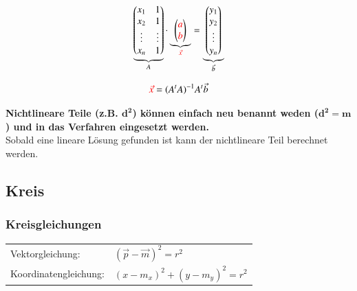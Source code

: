 \vspace{0.2cm}

\begin{minipage}[c]{0.48\columnwidth}
	$$ \underbrace{\begin{pmatrix}
			x_1 & 1 \\
			x_2 & 1 \\
			\vdots & \vdots \\
			x_n & 1
		\end{pmatrix}}_{\substack{A}} 
		\cdot
		\underbrace{\begin{pmatrix}
			{\color{red}a} \\
			{\color{red}b}
		\end{pmatrix}}_{\substack{{\color{red}\vec{x}}}} 
		= 
		\underbrace{\begin{pmatrix}
			y_1 \\
			y_2 \\
			\vdots \\
			y_n
		\end{pmatrix}}_{\substack{\vec{b}}} $$
\end{minipage}
\hfill
\begin{minipage}[c]{0.48\columnwidth}
	$$ {\color{red}\vec{x}} = (A^t A)^{-1} A^t \vec{b} $$
\end{minipage}

\vspace{0.2cm}
\textbf{Nichtlineare Teile (z.B. $\bm{d^2}$) können einfach neu benannt weden ($\bm{d^2 = m}$) und in das Verfahren eingesetzt werden.} \\
Sobald eine lineare Lösung gefunden ist kann der nichtlineare Teil berechnet werden.


\subsection{Kreis}		
		
\subsubsection{Kreisgleichungen}

\begin{tabular}{ll}
	Vektorgleichung: 		& $(\vec{p} - \vec{m})^2 = r^2$		\\
	Koordinatengleichung: 	& $(x- m_x)^2 + (y-m_y)^2 = r^2$
\end{tabular}
		

